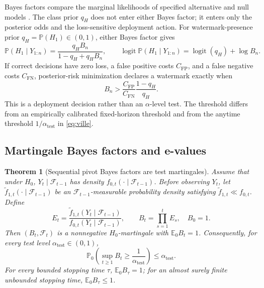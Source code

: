 \documentclass[11pt]{article}
\newtheorem{theorem}{Theorem}
\newcommand{\E}{\mathbb E}
\newcommand{\Prb}{\mathbb P}
\newcommand{\F}{\mathcal F}
\newcommand{\logit}{\operatorname{logit}}
\begin{document}
Bayes factors compare the marginal likelihoods of specified alternative and null models \citep{kass1995bayes}.  The class prior $q_H$ does not enter either Bayes factor; it enters only the posterior odds and the loss-sensitive deployment action.  For watermark-presence prior $q_H=\Prb(H_1)\in(0,1)$, either Bayes factor gives
\begin{equation}
  \Prb(H_1\mid Y_{1:n})
  =\frac{q_HB_n}{1-q_H+q_HB_n},
  \qquad
  \logit\Prb(H_1\mid Y_{1:n})=\logit(q_H)+\log B_n.
  \label{eq:posterior}
\end{equation}
If correct decisions have zero loss, a false positive costs $C_{\mathrm{FP}}$, and a false negative costs $C_{\mathrm{FN}}$, posterior-risk minimization declares a watermark exactly when
\begin{equation}
  B_n>\frac{C_{\mathrm{FP}}}{C_{\mathrm{FN}}}\frac{1-q_H}{q_H}.
  \label{eq:loss-threshold}
\end{equation}
This is a deployment decision rather than an $\alpha$-level test.  The threshold differs from an empirically calibrated fixed-horizon threshold and from the anytime threshold $1/\alpha_{\mathrm{test}}$ in \eqref{eq:ville}.

\subsection{Martingale Bayes factors and e-values}

\begin{theorem}[Sequential pivot Bayes factors are test martingales]\label{thm:martingale}
Assume that under $H_0$, $Y_t\mid\F_{t-1}$ has density $f_{0,t}(\cdot\mid\F_{t-1})$.  Before observing $Y_t$, let $\widetilde f_{1,t}(\cdot\mid\F_{t-1})$ be an $\F_{t-1}$-measurable probability density satisfying $\widetilde f_{1,t}\ll f_{0,t}$.  Define
\begin{equation}
  E_t=\frac{\widetilde f_{1,t}(Y_t\mid\F_{t-1})}
  {f_{0,t}(Y_t\mid\F_{t-1})},
  \qquad B_t=\prod_{s=1}^tE_s,\quad B_0=1.
  \label{eq:predictive-bf}
\end{equation}
Then $(B_t,\F_t)$ is a nonnegative $H_0$-martingale with $\E_0B_t=1$.  Consequently, for every test level $\alpha_{\mathrm{test}}\in(0,1)$,
\begin{equation}
  \Prb_0\left(\sup_{t\ge1}B_t\ge\frac1{\alpha_{\mathrm{test}}}\right)\le\alpha_{\mathrm{test}}.
  \label{eq:ville}
\end{equation}
For every bounded stopping time $\tau$, $\E_0B_\tau=1$; for an almost surely finite unbounded stopping time, $\E_0B_\tau\le1$.
\end{theorem}
\end{document}
